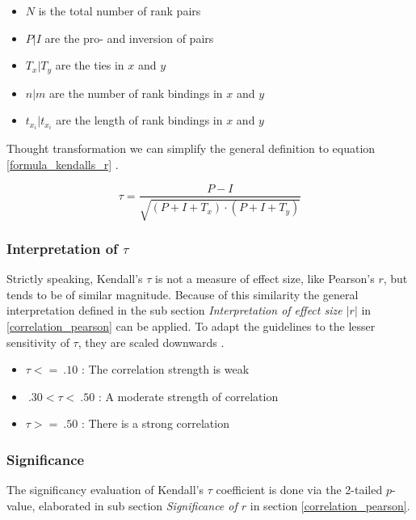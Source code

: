 \documentclass[a4paper,headsepline,footsepline,fontsize=11pt,BCOR=12mm,DIV=12]{report}
\begin{document}
\begin{itemize}
	\setlength\itemsep{0.1em}	
	\item[] $N$ is the total number of rank pairs 
	\item[] $P | I$ are the pro- and inversion of pairs
	\item[] $T_x | T_y$ are the ties in $x$ and $y$
	\item[] $n | m$ are the number of rank bindings in $x$ and $y$
	\item[] $t_{x_i} | t_{x_i}$ are the length of rank bindings in $x$ and $y$
\end{itemize}

\bigskip

Thought transformation we can simplify the general definition to equation \ref{formula_kendalls_r} \cite{Reiter2015}.

\begin{equation}
\label{formula_kendalls_r}
	\tau = \frac{P-I}{\sqrt{(P+I+T_x) \cdot (P+I+T_y)}}
\end{equation}

\subsubsection{Interpretation of $\tau$}
Strictly speaking, Kendall's $\tau$ is not a measure of effect size, like Pearson's $r$, but tends to be of similar magnitude. Because of this similarity the general interpretation defined in the sub section \textit{Interpretation of effect size $|r|$} in \ref{correlation_pearson} can be applied. To adapt the guidelines to the lesser sensitivity of $\tau$, they are scaled downwards \cite{Regber2016}.

\begin{itemize}
	\item $\tau <= \: .10$ : The correlation strength is weak
	\item $\: .30 < \tau < \: .50$ : A moderate strength of correlation
	\item $\tau >= \: .50$ : There is a strong correlation
\end{itemize}

\subsubsection{Significance}
The significancy evaluation of Kendall's $\tau$ coefficient is done via the 2-tailed $p$-value, elaborated in sub section \textit{Significance of $r$} in section \ref{correlation_pearson}.
\end{document}
